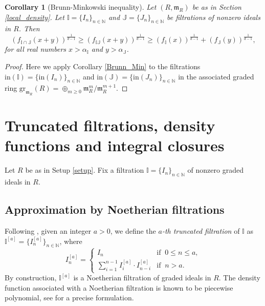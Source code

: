 \documentclass[12pt,a4paper]{amsart}
\theoremstyle{plain}
\newtheorem{corollary}[theorem]{Corollary}
\theoremstyle{definition}
\numberwithin{equation}{theorem}
\newcommand{\mm}{\mathfrak{m}}
\begin{document}
\begin{corollary}[Brunn-Minkowski inequality]
 Let $(R,\mm_R)$ be as in Section \ref{local_density}. Let $\mathbb{I} = \{I_n\}_{n\in\mathbb{N}}$ and $\mathbb{J} = \{J_n\}_{n\in\mathbb{N}}$ be filtrations of nonzero ideals in $R$. Then $${\left(f_{\mathbb{I}\cap \mathbb{J}}(x+y)\right)}^{\tfrac{1}{d-1}} \geq {\left(f_{\mathbb{IJ}}(x+y)\right)}^{\tfrac{1}{d-1}} \geq {\left(f_{\mathbb{I}}(x)\right)}^{\tfrac{1}{d-1}} + {\left(f_{\mathbb{J}}(y)\right)}^{\tfrac{1}{d-1}},$$ for all real numbers $x>\alpha_{\mathbb{I}}$ and $y>\alpha_{\mathbb{J}}$.
\end{corollary}
\begin{proof}
Here we apply Corollary \ref{Brunn_Min} to the filtrations $\mathrm{in}(\mathbb{I}) = \{\mathrm{in}(I_n)\}_{n\in\mathbb{N}}$ and $\mathrm{in}(\mathbb{J}) = \{\mathrm{in}(J_n)\}_{n\in\mathbb{N}}$ in the associated graded ring $\mathrm{gr}_{\mm_R}(R) = \oplus_{m\geq 0}\mm_R^m/\mm_R^{m+1}$.
\end{proof}

\section{Truncated filtrations, density functions and integral closures}\label{section 5}

Let $R$ be as in Setup \ref{setup}. Fix a filtration $\mathbb{I}=\{I_n\}_{n\in\mathbb{N}}$ of nonzero graded ideals in $R$.

\subsection{Approximation by Noetherian filtrations}\label{Noeth_Filt}

Following \cite[Definition 4.1]{CSS19}, given an integer $a>0$, we define the \emph{$a$-th truncated filtration} of $\mathbb{I}$ as $\mathbb{I}^{[a]} = \big\{I^{[a]}_n\big\}_{n\in\mathbb{N}}$, where $$I^{[a]}_n=\begin{cases}
 I_n & \text{if}\;\;0\leq n\leq a,\\
 \sum_{i=1}^{n-1} I^{[a]}_i\cdot I^{[a]}_{n-i} & \text{if}\;\;n>a.                                                                                                                                                                                           \end{cases}
$$
By construction, $\mathbb{I}^{[a]}$ is a Noetherian filtration of graded ideals in $R$. The density function associated with a Noetherian filtration is known to be piecewise polynomial, see \cite[Theorem 4.4]{DRT25} for a precise formulation.
\end{document}
